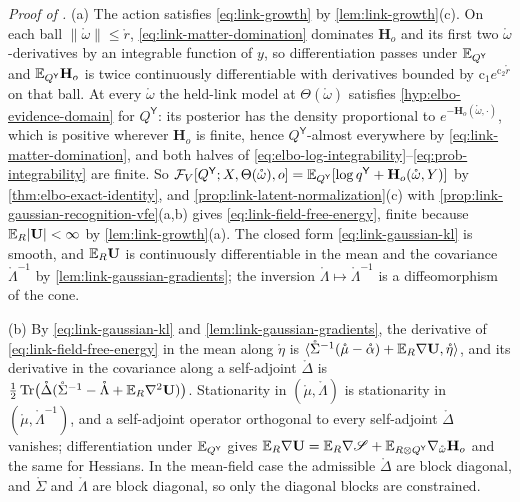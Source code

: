 \noindent\emph{Proof of .}
(a) The action satisfies \eqref{eq:link-growth} by \cref{lem:link-growth}(c). On each ball
$\lVert\mathring\omega\rVert\leq\mathring r$, \eqref{eq:link-matter-domination} dominates $\mathbf H_o$ and its first two
$\mathring\omega$-derivatives by an integrable function of $y$, so differentiation passes under
$\mathbb E_{Q^{\mathsf Y}}$ and $\mathbb E_{Q^{\mathsf Y}}\mathbf H_o$ is twice continuously differentiable with derivatives bounded
by $\mathrm c_1e^{\mathrm c_2\mathring r}$ on that ball. At every $\mathring\omega$ the held-link model at
$\Theta(\mathring\omega)$ satisfies \cref{hyp:elbo-evidence-domain} for $Q^{\mathsf Y}$: its posterior has the
density proportional to $e^{-\mathbf H_o(\mathring\omega,\cdot)}$, which is positive wherever $\mathbf H_o$ is
finite, hence $Q^{\mathsf Y}$-almost everywhere by \eqref{eq:link-matter-domination}, and both halves of
\eqref{eq:elbo-log-integrability}--\eqref{eq:prob-integrability} are finite. So
$\mathcal F_V[Q^{\mathsf Y};X,\Theta(\mathring\omega),o]=\mathbb E_{Q^{\mathsf Y}}[\log q^{\mathsf Y}+\mathbf H_o(\mathring\omega,Y)]$ by
\cref{thm:elbo-exact-identity}, and \cref{prop:link-latent-normalization}(c) with
\cref{prop:link-gaussian-recognition-vfe}(a,b) gives \eqref{eq:link-field-free-energy}, finite because
$\mathbb E_R\lvert\mathbf U\rvert<\infty$ by \cref{lem:link-growth}(a). The closed form \eqref{eq:link-gaussian-kl} is
smooth, and $\mathbb E_R\mathbf U$ is continuously differentiable in the mean and the covariance
$\mathring\Lambda^{-1}$ by \cref{lem:link-gaussian-gradients}; the inversion
$\mathring\Lambda\mapsto\mathring\Lambda^{-1}$ is a diffeomorphism of the cone.

(b) By \eqref{eq:link-gaussian-kl} and \cref{lem:link-gaussian-gradients}, the derivative of
\eqref{eq:link-field-free-energy} in the mean along $\mathring\eta$ is
$\langle\mathring\Sigma^{-1}(\mathring\mu-\mathring\alpha)+\mathbb E_R\nabla\mathbf U,\mathring\eta\rangle$, and its derivative in the
covariance along a self-adjoint $\mathring\Delta$ is
$\frac12\operatorname{Tr}\bigl(\mathring\Delta(\mathring\Sigma^{-1}-\mathring\Lambda+\mathbb E_R\nabla^2\mathbf U)\bigr)$. Stationarity in
$(\mathring\mu,\mathring\Lambda)$ is stationarity in $(\mathring\mu,\mathring\Lambda^{-1})$, and a self-adjoint
operator orthogonal to every self-adjoint $\mathring\Delta$ vanishes; differentiation under $\mathbb E_{Q^{\mathsf Y}}$
gives $\mathbb E_R\nabla\mathbf U=\mathbb E_R\nabla\mathscr S+\mathbb E_{R\otimes Q^{\mathsf Y}}\nabla_{\mathring\omega}\mathbf H_o$ and the same
for Hessians. In the mean-field case the admissible $\mathring\Delta$ are block diagonal, and $\mathring\Sigma$ and
$\mathring\Lambda$ are block diagonal, so only the diagonal blocks are constrained.

